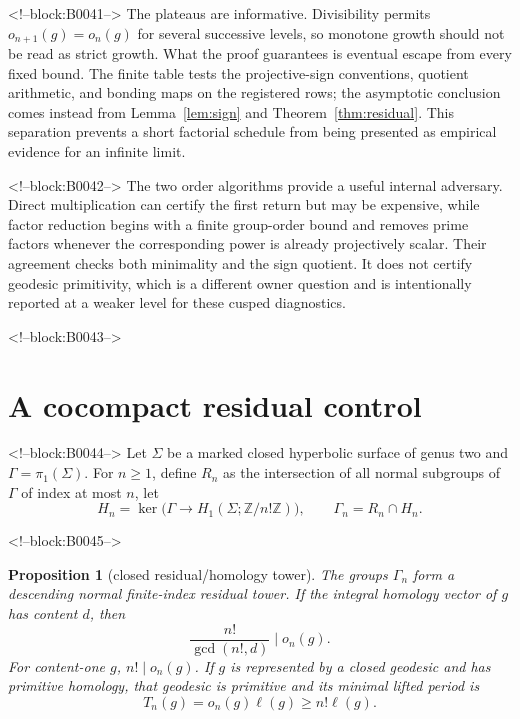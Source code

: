 \documentclass[11pt]{article}
\newtheorem{proposition}[theorem]{Proposition}
\theoremstyle{definition}
\theoremstyle{remark}
\newcommand{\ZZ}{\mathbb Z}
\begin{document}
<!--block:B0041-->
The plateaus are informative. Divisibility permits $o_{n+1}(g)=o_n(g)$ for several successive levels, so monotone growth should not be read as strict growth. What the proof guarantees is eventual escape from every fixed bound. The finite table tests the projective-sign conventions, quotient arithmetic, and bonding maps on the registered rows; the asymptotic conclusion comes instead from Lemma~\ref{lem:sign} and Theorem~\ref{thm:residual}. This separation prevents a short factorial schedule from being presented as empirical evidence for an infinite limit.

<!--block:B0042-->
The two order algorithms provide a useful internal adversary. Direct multiplication can certify the first return but may be expensive, while factor reduction begins with a finite group-order bound and removes prime factors whenever the corresponding power is already projectively scalar. Their agreement checks both minimality and the sign quotient. It does not certify geodesic primitivity, which is a different owner question and is intentionally reported at a weaker level for these cusped diagnostics.

<!--block:B0043-->
\section{A cocompact residual control}

<!--block:B0044-->
Let $\Sigma$ be a marked closed hyperbolic surface of genus two and $\Gamma=\pi_1(\Sigma)$. For $n\geq1$, define $R_n$ as the intersection of all normal subgroups of $\Gamma$ of index at most $n$, let
\[
H_n=\ker\bigl(\Gamma\to H_1(\Sigma;\ZZ/n!\ZZ)\bigr),
\qquad
\Gamma_n=R_n\cap H_n.
\]

<!--block:B0045-->
\begin{proposition}[closed residual/homology tower]\label{prop:closed}
The groups $\Gamma_n$ form a descending normal finite-index residual tower. If the integral homology vector of $g$ has content $d$, then
\[
\frac{n!}{\gcd(n!,d)}\mid o_n(g).
\]
For content-one $g$, $n!\mid o_n(g)$. If $g$ is represented by a closed geodesic and has primitive homology, that geodesic is primitive and its minimal lifted period is
\[
T_n(g)=o_n(g)\ell(g)\geq n!\ell(g).
\]
\end{proposition}
\end{document}
